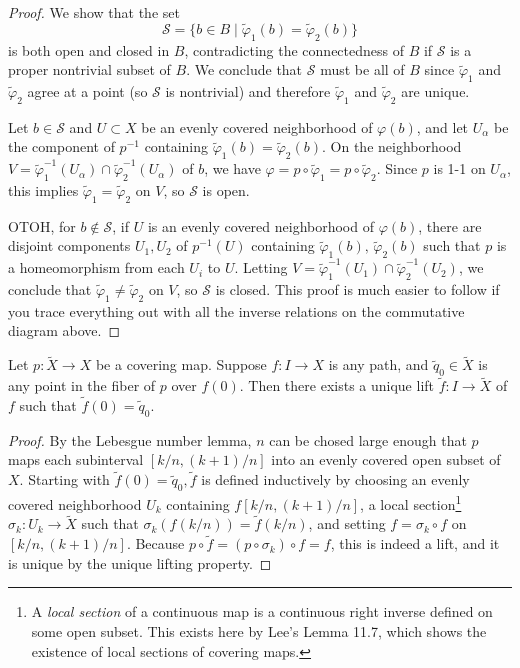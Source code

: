\begin{proof}
    We show that the set \[
        \mathcal{S}=\{b\in B \mid \widetilde \varphi_1 (b)=\widetilde\varphi_2(b)  \} 
    \] is both open and closed in $B$, contradicting the connectedness of $B$ if $\mathcal{S} $ is a proper nontrivial subset of $B$. We conclude that $\mathcal{S} $ must be all of $B$ since $\widetilde \varphi_1 $ and $\widetilde\varphi_2 $ agree at a point (so $\mathcal{S} $ is nontrivial) and therefore $\widetilde\varphi_1 $ and $\widetilde\varphi_2 $ are unique.

    Let $b\in \mathcal{S} $ and $U\subset X$ be an evenly covered neighborhood of $\varphi (b)$, and let $U_{\alpha }$ be the component of $p ^{-1}$ containing $\widetilde \varphi_1(b)=\widetilde \varphi_2(b)  $. On the neighborhood $V=\widetilde \varphi_1^{-1}(U_{\alpha })\cap \widetilde \varphi_2^{-1}(U_{\alpha }) $ of $b$, we have $\varphi =p\circ \widetilde \varphi_1= p \circ \widetilde \varphi_2  $. Since $p$ is 1-1 on $U_{\alpha }$, this implies $\widetilde \varphi_1=\widetilde \varphi_2  $ on $V$, so $\mathcal{S} $ is open. 

    OTOH, for $b\notin \mathcal{S} $, if $U$ is an evenly covered neighborhood of $\varphi (b)$, there are disjoint components $U_1,U_2$ of $p ^{-1}(U)$ containing $\widetilde \varphi_1(b),\,\widetilde \varphi_2(b)  $ such that $p$ is a homeomorphism from each $U_i$ to $U$. Letting $V=\widetilde \varphi_1^{-1}(U_1)\cap \widetilde \varphi_2^{-1}(U_2)  $, we conclude that $\widetilde \varphi_1\neq \widetilde \varphi_2  $ on $V$, so $\mathcal{S} $ is closed. This proof is much easier to follow if you trace everything out with all the inverse relations on the commutative diagram above.
\end{proof}
\begin{prop}
    Let $p \colon \widetilde X \to X$ be a covering map. Suppose $f \colon I \to X$ is any path, and $\widetilde q_0\in \widetilde X$ is any point in the fiber of $p$ over $f(0)$. Then there exists a unique lift $\widetilde f \colon I \to \widetilde X$ of $f$ such that $\widetilde f(0)=\widetilde q_0$. 
\end{prop}
\begin{proof}
    By the Lebesgue number lemma, $n$ can be chosed large enough that $p$ maps each subinterval $[k/n,(k+1)/n]$ into an evenly covered open subset of $X$. Starting with $\widetilde f(0)=\widetilde q_0, \widetilde f$ is defined inductively by choosing an evenly covered neighborhood $U_k$ containing $f[k /n,(k+1)/n]$, a local section\footnote{A \emph{local section} of a continuous map is a continuous right inverse defined on some open subset. This exists here by Lee's Lemma 11.7, which shows the existence of local sections of covering maps.} $\sigma_k \colon U_k \to \widetilde X$ such that $\sigma_k(f(k /n))=\widetilde f(k /n)$, and setting $f=\sigma_k\circ f$ on $[k /n,(k+1)/n]$. Because $p\circ \widetilde f=(p\circ \sigma_k)\circ f=f$, this is indeed a lift, and it is unique by the unique lifting property.
\end{proof}
